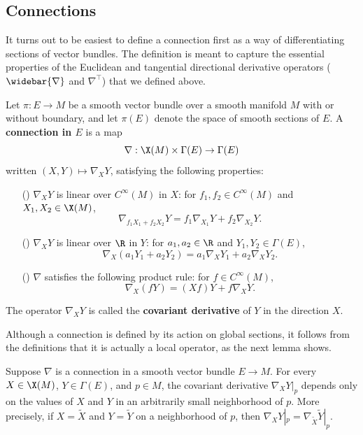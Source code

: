 \subsection{Connections}
It turns out to be easiest to define a connection first as a way of differentiating sections of vector bundles. The definition is meant to capture the essential properties of the Euclidean and tangential directional derivative operators ($\widebar{\nabla}$ and $\nabla^{\top}$) that we defined above.\par
Let $\pi:E\to M$ be a smooth vector bundle over a smooth manifold $M$ with or without boundary, and let $\pi(E)$ denote the space of smooth sections of $E$. A \textbf{connection in $E$} is a map
\[\nabla:\X(M)\times\Gamma(E)\to\Gamma(E)\]
written $(X,Y)\mapsto\nabla_XY$, satisfying the following properties:
\begin{itemize}
\item[(\rmnum{1})] $\nabla_XY$ is linear over $C^{\infty}(M)$ in $X$: for $f_1,f_2\in C^{\infty}(M)$ and $X_1,X_2\in\X(M)$,
\[\nabla_{f_1X_1+f_2X_2}Y=f_1\nabla_{X_1}Y+f_2\nabla_{X_2}Y.\]
\item[(\rmnum{2})] $\nabla_XY$ is linear over $\R$ in $Y$: for $a_1,a_2\in\R$ and $Y_1,Y_2\in\Gamma(E)$,
\[\nabla_X(a_1Y_1+a_2Y_2)=a_1\nabla_XY_1+a_2\nabla_XY_2.\]
\item[(\rmnum{3})] $\nabla$ satisfies the following product rule: for $f\in C^{\infty}(M)$,
\[\nabla_X(fY)=(Xf)Y+f\nabla_XY.\]
\end{itemize}
The operator $\nabla_XY$ is called the\textbf{ covariant derivative} of $Y$ in the direction $X$.\par
Although a connection is defined by its action on global sections, it follows from the definitions that it is actually a local operator, as the next lemma shows.
\begin{lemma}\label{connection local}
Suppose $\nabla$ is a connection in a smooth vector bundle $E\to M$. For every $X\in\X(M)$, $Y\in\Gamma(E)$, and $p\in M$, the covariant derivative $\nabla_XY|_p$ depends only on the values of $X$ and $Y$ in an arbitrarily small neighborhood of $p$. More precisely, if $X=\widetilde{X}$ and $Y=\widetilde{Y}$ on a neighborhood of $p$, then $\nabla_{X}Y|_p=\nabla_{\widetilde{X}}\widetilde{Y}|_p$.
\end{lemma}
